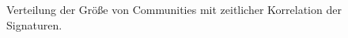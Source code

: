 \begin{figure}[th!]
  \caption{Verteilung der Größe von Communities mit zeitlicher
    Korrelation der Signaturen.}
  \label{fig:time-corrdist}
\end{figure}

